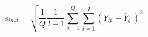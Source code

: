 

\[
s_{inst} = \sqrt{\frac{1}{Q}\frac{1}{I-1}\sum_{q=1}^{Q}{\sum_{i=1}^{I}{(Y_{qi} - \bar{Y}_{q.})^2}}}
\]


